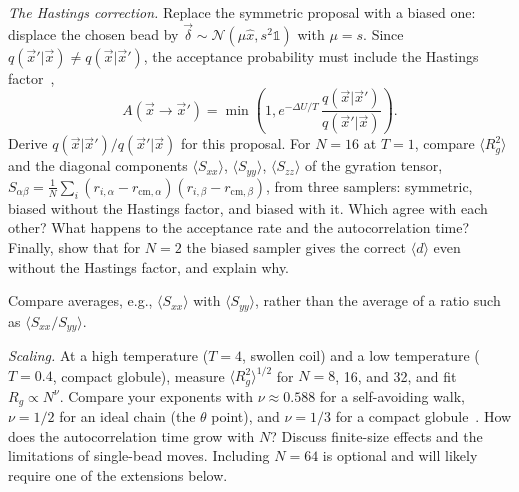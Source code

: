 \begin{problem}
  \emph{The Hastings correction.}
  Replace the symmetric proposal with a biased one: displace the chosen bead by $\vec\delta \sim \mathcal N(\mu\hat x, s^2 \mathbb{1})$ with $\mu = s$.
  Since $q(\vec x'|\vec x)\neq q(\vec x|\vec x')$, the acceptance probability must include the Hastings factor~\cite{Hastings:1970},
  \begin{equation}
    A(\vec x\to\vec x') = \min\left(1, e^{-\Delta U/T}\,\frac{q(\vec x|\vec x')}{q(\vec x'|\vec x)}\right).
  \end{equation}
  Derive $q(\vec x|\vec x')/q(\vec x'|\vec x)$ for this proposal.
  For $N=16$ at $T=1$, compare $\langle R_g^2\rangle$ and the diagonal components $\langle S_{xx}\rangle$, $\langle S_{yy}\rangle$, $\langle S_{zz}\rangle$ of the gyration tensor, $S_{\alpha\beta} = \frac{1}{N}\sum_i (r_{i,\alpha} - r_{\text{cm},\alpha})(r_{i,\beta} - r_{\text{cm},\beta})$, from three samplers: symmetric, biased without the Hastings factor, and biased with it.
  Which agree with each other? What happens to the acceptance rate and the autocorrelation time?
  Finally, show that for $N=2$ the biased sampler gives the correct $\langle d\rangle$ even without the Hastings factor, and explain why.

  \begin{hint}
    Compare averages, e.g., $\langle S_{xx}\rangle$ with $\langle S_{yy}\rangle$, rather than the average of a ratio such as $\langle S_{xx}/S_{yy}\rangle$.
  \end{hint}
\end{problem}

\begin{problem}
  \emph{Scaling.}
  At a high temperature ($T=4$, swollen coil) and a low temperature ($T=0.4$, compact globule), measure $\langle R_g^2\rangle^{1/2}$ for $N = 8$, 16, and 32, and fit $R_g \propto N^\nu$.
  Compare your exponents with $\nu \approx 0.588$ for a self-avoiding walk, $\nu = 1/2$ for an ideal chain (the $\theta$ point), and $\nu = 1/3$ for a compact globule~\cite{deGennes:1979}.
  How does the autocorrelation time grow with $N$?
  Discuss finite-size effects and the limitations of single-bead moves.
  Including $N=64$ is optional and will likely require one of the extensions below.
\end{problem}

